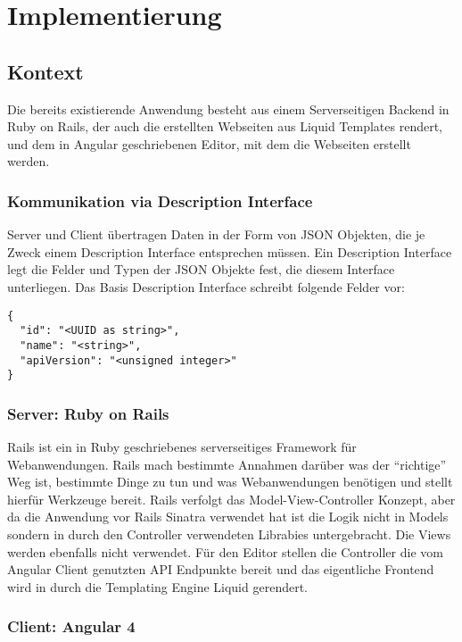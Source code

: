 \section{Implementierung}
\label{sec:implementation-analysis}

\subsection{Kontext}

Die bereits existierende Anwendung besteht aus einem Serverseitigen Backend in
Ruby on Rails, der auch die erstellten Webseiten aus Liquid Templates rendert,
und dem in Angular geschriebenen Editor, mit dem die Webseiten erstellt werden.

\subsubsection{Kommunikation via Description Interface}

Server und Client übertragen Daten in der Form von JSON Objekten, die je Zweck
einem Description Interface entsprechen müssen. Ein Description Interface legt
die Felder und Typen der JSON Objekte fest, die diesem Interface unterliegen.
Das Basis Description Interface schreibt folgende Felder vor:

\begin{verbatim}
{
  "id": "<UUID as string>",
  "name": "<string>",
  "apiVersion": "<unsigned integer>"
}
\end{verbatim}

\subsubsection{Server: Ruby on Rails}

Rails ist ein in Ruby geschriebenes serverseitiges Framework für
Webanwendungen. Rails mach bestimmte Annahmen darüber was der ``richtige'' Weg
ist, bestimmte Dinge zu tun und was Webanwendungen benötigen und stellt hierfür
Werkzeuge bereit. Rails verfolgt das Model-View-Controller Konzept, aber da die
Anwendung vor Rails Sinatra verwendet hat ist die Logik nicht in Models sondern
in durch den Controller verwendeten Librabies untergebracht. Die Views werden
ebenfalls nicht verwendet. Für den Editor stellen die Controller die vom Angular
Client genutzten API Endpunkte bereit und das eigentliche Frontend wird in durch
die Templating Engine Liquid gerendert.

\subsubsection{Client: Angular 4}

